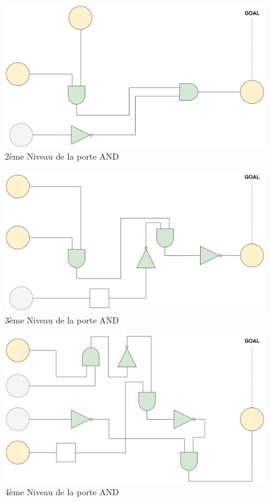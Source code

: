 \documentclass{article}
\begin{document}
\begin{figure}[h]
    \centering
    \includegraphics[width=\textwidth]{img/Levels-AND-2.jpg}
    \caption{2ème Niveau de la porte AND}
\end{figure}
\begin{figure}[h]
    \centering
    \includegraphics[width=\textwidth]{img/Levels-AND-3.jpg}
    \caption{3ème Niveau de la porte AND}
\end{figure}
\begin{figure}[h]
    \centering
    \includegraphics[width=\textwidth]{img/Levels-AND-4.jpg}
    \caption{4ème Niveau de la porte AND}
\end{figure}
\end{document}
